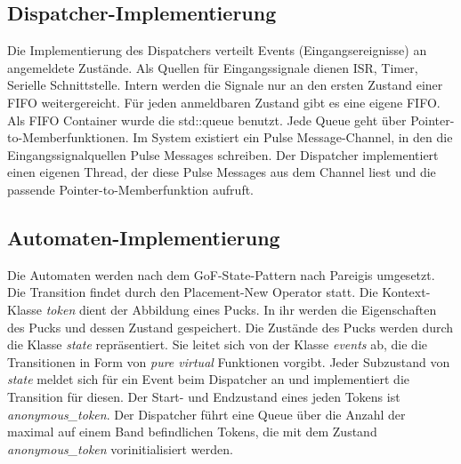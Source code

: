 \documentclass[oneside,a4paper,titlepage]{scrartcl}              %
\begin{document}
\subsection{Dispatcher-Implementierung}
Die Implementierung des Dispatchers verteilt Events (Eingangsereignisse) an angemeldete Zustände.
Als Quellen für Eingangssignale dienen ISR, Timer, Serielle Schnittstelle. Intern werden die Signale
nur an den ersten Zustand einer FIFO weitergereicht. Für jeden anmeldbaren Zustand gibt es eine eigene FIFO.\newline
Als FIFO Container wurde die std::queue benutzt. Jede Queue geht über Pointer-to-Memberfunktionen.
Im System existiert ein Pulse Message-Channel, in den die Eingangssignalquellen Pulse Messages schreiben.
Der Dispatcher implementiert einen eigenen Thread, der diese Pulse Messages aus dem Channel liest und die passende Pointer-to-Memberfunktion aufruft.

\subsection{Automaten-Implementierung}
Die Automaten werden nach dem GoF-State-Pattern nach Pareigis umgesetzt. Die Transition findet durch den
Placement-New Operator statt. Die Kontext-Klasse \emph{token} dient der Abbildung eines Pucks. In ihr werden die
Eigenschaften des Pucks und dessen Zustand gespeichert.\newline
Die Zustände des Pucks werden durch die Klasse \emph{state} repräsentiert. Sie leitet sich von der Klasse
\emph{events} ab, die die Transitionen in Form von \emph{pure virtual} Funktionen vorgibt.\newline
Jeder Subzustand von \emph{state} meldet sich für ein Event beim Dispatcher an und implementiert die Transition
für diesen.\newline
Der Start- und Endzustand eines jeden Tokens ist \emph{anonymous\_token}.\newline
Der Dispatcher führt eine Queue über die Anzahl der maximal auf einem Band befindlichen Tokens, die mit dem Zustand
\emph{anonymous\_token} vorinitialisiert werden.

\newpage

\end{document}

